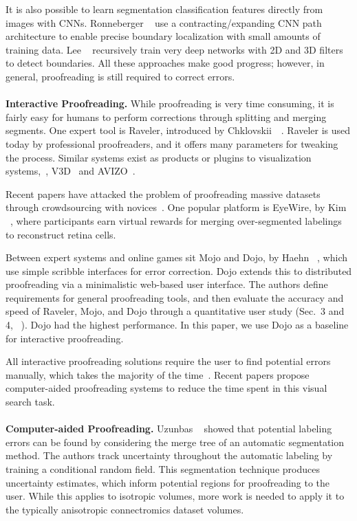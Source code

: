 It is also possible to learn segmentation classification features directly from images with CNNs. Ronneberger \etal~\cite{RonnebergerFB15} use a contracting/expanding CNN path architecture to enable precise boundary localization with small amounts of training data. Lee \etal~\cite{lee2015recursive} recursively train very deep networks with 2D and 3D filters to detect boundaries.
%
All these approaches make good progress; however, in general, proofreading is still required to correct errors.
\\~\\
\textbf{Interactive Proofreading.} While proofreading is very time consuming, it is fairly easy for humans to perform corrections through splitting and merging segments. One expert tool is Raveler, introduced by Chklovskii~\etal~\cite{chklovskii2010, raveler}. Raveler is used today by professional proofreaders, and it offers many parameters for tweaking the process. Similar systems exist as products or plugins to visualization systems,~\eg, V3D~\cite{proofreading_bottleneck} and AVIZO~\cite{markus_proofreading}.

Recent papers have attacked the problem of proofreading massive datasets through crowdsourcing with novices~\cite{saalfeld09,anderson2011,Giuly2013DP2}. One popular platform is EyeWire, by Kim \etal~\cite{eyewire_nature}, where participants earn virtual rewards for merging over-segmented labelings to reconstruct retina cells.

Between expert systems and online games sit Mojo and Dojo, by Haehn
\etal~\cite{haehn_dojo_2014,Neuroblocks}, which use simple scribble interfaces
for error correction. Dojo extends this to distributed proofreading via a
minimalistic web-based user interface. The authors define requirements for
general proofreading tools, and then evaluate the accuracy and speed of Raveler,
Mojo, and Dojo through a quantitative user study (Sec.~3 and
4, ~\cite{haehn_dojo_2014}). Dojo had the highest performance. In this paper, we
use Dojo as a baseline for interactive proofreading.

All interactive proofreading solutions require the user to find potential errors manually, which takes the majority of the time~\cite{proofreading_bottleneck,haehn_dojo_2014}. Recent papers propose computer-aided proofreading systems to reduce the time spent in this visual search task.
\\~\\
\textbf{Computer-aided Proofreading.} Uzunbas \etal~\cite{uzunbas} showed that potential labeling errors can be found by considering the merge tree of an automatic segmentation method. The authors track uncertainty throughout the automatic labeling by training a conditional random field. This segmentation technique produces uncertainty estimates, which inform potential regions for proofreading to the user. While this applies to isotropic volumes, more work is needed to apply it to the typically anisotropic connectromics dataset volumes.

